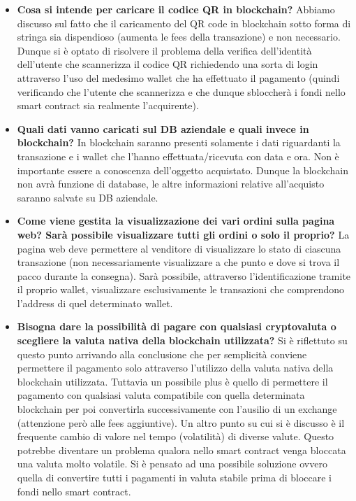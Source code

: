 \documentclass[a4paper,12pt]{article}
\begin{document}
\begin{itemize}

\item \textbf{Cosa si intende per caricare il codice QR in blockchain?}
Abbiamo discusso sul fatto che il caricamento del QR code in blockchain sotto forma di stringa sia dispendioso (aumenta le fees della transazione) e non 	necessario. Dunque si è optato di risolvere il problema della verifica dell’identità dell’utente che scannerizza il codice QR richiedendo una sorta di login attraverso l’uso del medesimo wallet che ha effettuato il pagamento (quindi verificando che l’utente che scannerizza e che dunque sbloccherà i fondi nello smart contract sia realmente l’acquirente).

\item \textbf{Quali dati vanno caricati sul DB aziendale e quali invece in blockchain?}
In blockchain saranno presenti solamente i dati riguardanti la transazione e i wallet che l’hanno effettuata/ricevuta con data e ora. Non è importante essere a conoscenza dell’oggetto acquistato.
 Dunque la blockchain non avrà funzione di database, le altre informazioni relative all’acquisto saranno salvate su DB aziendale.

\item \textbf{Come viene gestita la visualizzazione dei vari ordini sulla pagina web? Sarà possibile visualizzare tutti gli ordini o solo il proprio?}
La pagina web deve permettere al venditore di visualizzare lo stato di ciascuna transazione (non necessariamente visualizzare a che punto e dove si trova il pacco durante la consegna). Sarà possibile, attraverso l’identificazione tramite il proprio wallet, visualizzare esclusivamente le transazioni che comprendono l’address di quel determinato wallet.

\item \textbf{Bisogna dare la possibilità di pagare con qualsiasi cryptovaluta o scegliere la valuta nativa della blockchain utilizzata?}
Si è riflettuto su questo punto arrivando alla conclusione che per semplicità conviene permettere il pagamento solo attraverso l’utilizzo della valuta nativa della blockchain utilizzata. Tuttavia un possibile plus è quello di permettere il pagamento con qualsiasi valuta compatibile con quella determinata blockchain per poi convertirla successivamente con l’ausilio di un exchange (attenzione però alle fees aggiuntive). 
Un altro punto su cui si è discusso è il frequente cambio di valore nel tempo (volatilità) di diverse valute. Questo potrebbe diventare un problema qualora nello smart contract venga bloccata una valuta molto volatile. Si è pensato ad una possibile soluzione ovvero quella di convertire tutti i pagamenti in valuta stabile prima di bloccare i fondi nello smart contract.
 

\end{itemize}
\end{document}
